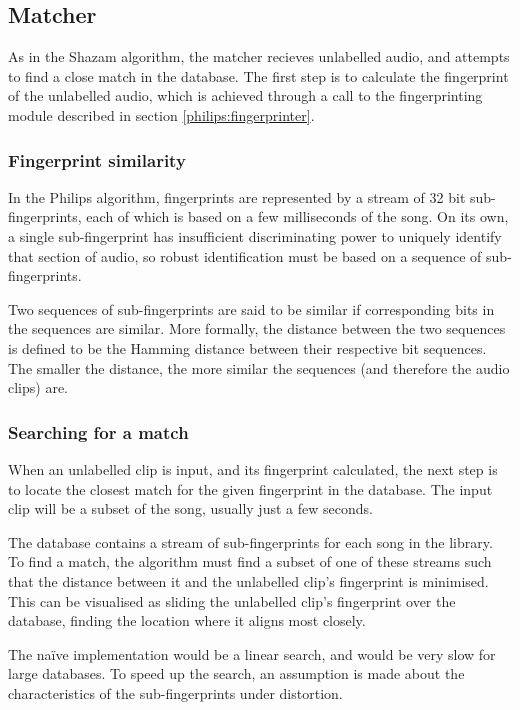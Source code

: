 \documentclass[12pt,a4paper,twoside,openright]{report}
\begin{document}
\subsection{Matcher}
\label{philips:matcher}

As in the Shazam algorithm, the matcher recieves unlabelled audio, and attempts to find a close match in the database. The first step is to calculate the fingerprint of the unlabelled audio, which is achieved through a call to the fingerprinting module described in section \ref{philips:fingerprinter}.

\subsubsection{Fingerprint similarity}

In the Philips algorithm, fingerprints are represented by a stream of 32 bit sub-fingerprints, each of which is based on a few milliseconds of the song. On its own, a single sub-fingerprint has insufficient discriminating power to uniquely identify that section of audio, so robust identification must be based on a sequence of sub-fingerprints.

Two sequences of sub-fingerprints are said to be similar if corresponding bits in the sequences are similar. More formally, the distance between the two sequences is defined to be the Hamming distance between their respective bit sequences. The smaller the distance, the more similar the sequences (and therefore the audio clips) are.


\subsubsection{Searching for a match}

When an unlabelled clip is input, and its fingerprint calculated, the next step is to locate the closest match for the given fingerprint in the database. The input clip will be a subset of the song, usually just a few seconds.

The database contains a stream of sub-fingerprints for each song in the library. To find a match, the algorithm must find a subset of one of these streams such that the distance between it and the unlabelled clip's fingerprint is minimised. This can be visualised as sliding the unlabelled clip's fingerprint over the database, finding the location where it aligns most closely.

The na\"ive implementation would be a linear search, and would be very slow for large databases. To speed up the search, an assumption is made about the characteristics of the sub-fingerprints under distortion. 
\end{document}
